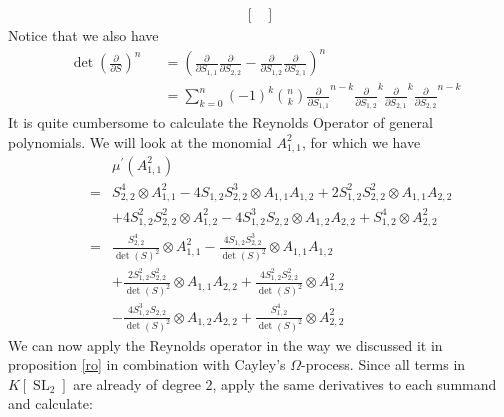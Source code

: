 \begin{example}
\begin{equation}
\begin{aligned}
\begin{bmatrix}
      \end{bmatrix}
    \end{aligned}
  \end{equation}
  Notice that we also have
  \begin{equation}
    \begin{aligned}
      &\operatorname{det}\left( \frac{\partial}{\partial S} \right)^n
      &&= \left( \frac{\partial}{\partial S_{1,1}} \frac{\partial}{\partial S_{2,2}} - \frac{\partial}{\partial S_{1,2}} \frac{\partial}{\partial S_{2,1}} \right)^n \\
      &&&= \sum_{k=0}^n (-1)^k \binom{n}{k} \frac{\partial}{\partial S_{1,1}}^{n-k} \frac{\partial}{\partial S_{1,2}}^k \frac{\partial}{\partial S_{2,1}}^k \frac{\partial}{\partial S_{2,2}}^{n-k}
    \end{aligned}
  \end{equation}
  It is quite cumbersome to calculate the Reynolds Operator of general polynomials.
  We will look at the monomial $A_{1,1}^2$, for which we have
  \begin{equation}
    \begin{aligned}
      &&&\mu^\prime (A_{1,1}^2) \\
      &&=& S_{2,2}^4 \otimes A_{1,1}^2 - 4S_{1,2}S_{2,2}^3 \otimes A_{1,1}A_{1,2} + 2S_{1,2}^2 S_{2,2}^2 \otimes A_{1,1}A_{2,2} \\
      &&& + 4S_{1,2}^2 S_{2,2}^2 \otimes A_{1,2}^2 - 4S_{1,2}^3 S_{2,2} \otimes A_{1,2}A_{2,2} + S_{1,2}^4 \otimes A_{2,2}^2\\
      &&=& \frac{S_{2,2}^4}{\operatorname{det}(S)^2} \otimes A_{1,1}^2 - \frac{4S_{1,2}S_{2,2}^3}{\operatorname{det}(S)^2} \otimes A_{1,1}A_{1,2} \\
      &&& + \frac{2S_{1,2}^2 S_{2,2}^2}{\operatorname{det}(S)^2} \otimes A_{1,1}A_{2,2} + \frac{4S_{1,2}^2 S_{2,2}^2}{\operatorname{det}(S)^2} \otimes A_{1,2}^2 \\
      &&& - \frac{4S_{1,2}^3 S_{2,2}}{\operatorname{det}(S)^2} \otimes A_{1,2}A_{2,2} + \frac{S_{1,2}^4}{\operatorname{det}(S)^2} \otimes A_{2,2}^2
    \end{aligned}
  \end{equation}
  We can now apply the Reynolds operator in the way we discussed it in proposition \ref{ro} in combination with Cayley's $\Omega$-process.
  Since all terms in $K[\operatorname{SL}_2]$ are already of degree $2$, apply the same derivatives to each summand and calculate:
  \begin{equation}
    \begin{aligned}

\end{aligned}
\end{equation}
\end{example}
